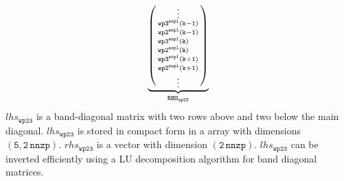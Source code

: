 \documentclass[11pt,fleqn]{article}
\begin{document}
\begin{equation}
\begin{split}
\underbrace{
\left( \begin{smallmatrix}
  \hfill \vdots \hfill \\
  \mathtt{ wp3^{expl}(k-1) } \\
  \mathtt{ wp2^{expl}(k-1) } \\
  \mathtt{ wp3^{expl}(k)\phantom{+0} } \\
  \mathtt{ wp2^{expl}(k)\phantom{+0} } \\
  \mathtt{ wp3^{expl}(k+1) } \\
  \mathtt{ wp2^{expl}(k+1) } \\
  \hfill \vdots \hfill
\end{smallmatrix} \right) }_{ \mathtt{RHS}_{\mathtt{wp23}}}
\end{split}
\end{equation}
%
$lhs_{\mathtt{wp23}}$ is a band-diagonal matrix with two rows above and two below 
the main diagonal. $lhs_{\mathtt{wp23}}$ is stored in compact form in a array 
with dimensions $\mathtt{(5,2\,nnzp)}$. $rhs_{\mathtt{wp23}}$ is a vector 
with dimension $\mathtt{(2\,nnzp)}$. $lhs_{\mathtt{wp23}}$ can be inverted 
efficiently using a LU decomposition algorithm for band diagonal matrices.
\end{document}
